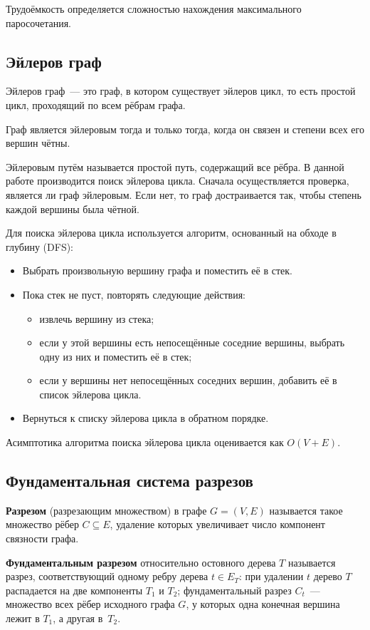 \documentclass[a4paper,final]{article}
\begin{document}
Трудоёмкость определяется сложностью нахождения максимального паросочетания.

	\subsection{Эйлеров граф}

Эйлеров граф~--- это граф, в котором существует эйлеров цикл, то есть простой цикл, проходящий по всем рёбрам графа.

Граф является эйлеровым тогда и только тогда, когда он связен и степени всех его вершин чётны.

Эйлеровым путём называется простой путь, содержащий все рёбра. В данной работе производится поиск эйлерова цикла. Сначала осуществляется проверка, является ли граф эйлеровым. Если нет, то граф достраивается так, чтобы степень каждой вершины была чётной.

Для поиска эйлерова цикла используется алгоритм, основанный на обходе в глубину (DFS):
\begin{itemize}
  \item Выбрать произвольную вершину графа и поместить её в стек.
  \item Пока стек не пуст, повторять следующие действия:
  \begin{itemize}
    \item извлечь вершину из стека;
    \item если у этой вершины есть непосещённые соседние вершины, выбрать одну из них и поместить её в стек;
    \item если у вершины нет непосещённых соседних вершин, добавить её в список эйлерова цикла.
  \end{itemize}
  \item Вернуться к списку эйлерова цикла в обратном порядке.
\end{itemize}

Асимптотика алгоритма поиска эйлерова цикла оценивается как $O(V+E)$.

	\subsection{Фундаментальная система разрезов}

\textbf{Разрезом} (разрезающим множеством) в графе $G = (V, E)$ называется такое множество рёбер $C \subseteq E$, удаление которых увеличивает число компонент связности графа.

\textbf{Фундаментальным разрезом} относительно остовного дерева $T$ называется разрез, соответствующий одному ребру дерева $t \in E_T$: при удалении $t$ дерево $T$ распадается на две компоненты $T_1$ и $T_2$; фундаментальный разрез $C_t$~--- множество всех рёбер исходного графа $G$, у которых одна конечная вершина лежит в $T_1$, а другая в~$T_2$.
\end{document}
